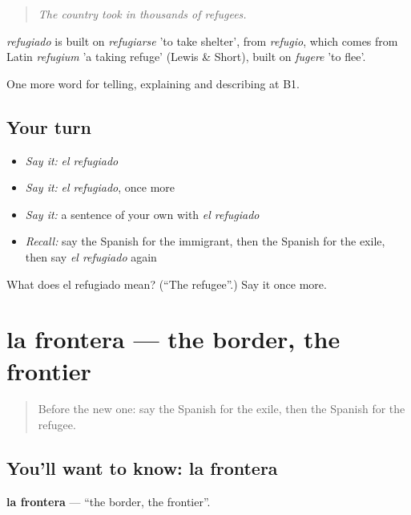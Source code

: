 \begin{quote}
\emph{The country took in thousands of refugees.}
\end{quote}

\begin{cousinweb}
\emph{refugiado} is built on \emph{refugiarse} 'to take shelter', from \emph{refugio}, which comes from Latin \emph{refugium} 'a taking refuge' (Lewis \& Short), built on \emph{fugere} 'to flee'.
\end{cousinweb}

\begin{grammarlens}[title={What you've built}]
One more word for telling, explaining and describing at B1.
\end{grammarlens}

\subsection*{Your turn}
\begin{itemize}
\raggedright
  \item \emph{Say it:} \emph{el refugiado}
  \item \emph{Say it:} \emph{el refugiado}, once more
  \item \emph{Say it:} a sentence of your own with \emph{el refugiado}
  \item \emph{Recall:} say the Spanish for the immigrant, then the Spanish for the exile, then say \emph{el refugiado} again
\end{itemize}

\begin{tcolorbox}[breakable,colback=teal!4,colframe=teal!35!black,title={Before you move on}]
What does el refugiado mean? (\textquotedblleft{}The refugee\textquotedblright{}.) Say it once more.
\end{tcolorbox}
\section[la frontera]{la frontera — the border, the frontier}

\label{lesson:ES-C552-frontera}



\begin{quote}
Before the new one: say the Spanish for the exile, then the Spanish for the refugee.
\end{quote}

\subsection*{You'll want to know: la frontera}
\textbf{la frontera} — \textquotedblleft{}the border, the frontier\textquotedblright{}.

